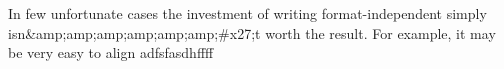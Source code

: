 
In few unfortunate cases the investment of writing format-independent \latex simply isn&amp;amp;amp;amp;amp;amp;#x27;t worth the result. For example, it may be very easy to align adfsfasdhffff